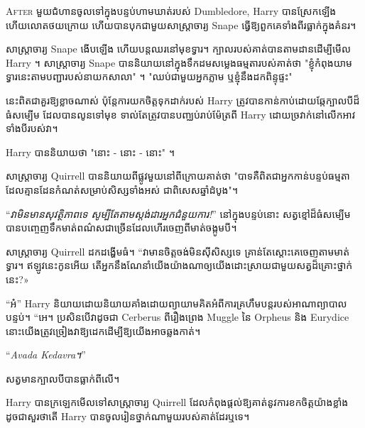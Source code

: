 
\lettrine{A}{fter} មួយជំហានចូលទៅក្នុងបន្ទប់ហាមឃាត់របស់ Dumbledore, Harry បានស្រែកឡើង ហើយលោតថយក្រោយ ហើយបានបុកជាមួយសាស្រ្តាចារ្យ Snape ធ្វើឱ្យពួកគេទាំងពីរធ្លាក់ក្នុងគំនរ។

សាស្រ្តាចារ្យ Snape ងើបឡើង ហើយបន្តឈរនៅមុខទ្វារ។ ក្បាលរបស់គាត់បានតាមដានដើម្បីមើល Harry ។ សាស្ត្រាចារ្យ Snape បាននិយាយនៅក្នុងទឹកដមសម្លេងធម្មតារបស់គាត់ថា "ខ្ញុំកំពុងយាមទ្វារនេះតាមបញ្ជារបស់នាយកសាលា" ។ "ឈប់ជាមួយអ្នកភ្លាម ឬខ្ញុំនឹងដកពិន្ទុផ្ទះ"

នេះពិតជាគួរឱ្យខ្លាចណាស់ ប៉ុន្តែការយកចិត្តទុកដាក់របស់ Harry ត្រូវបានកាន់កាប់ដោយឆ្កែក្បាលបីដ៏ធំសម្បើម ដែលបានលូនទៅមុខ ទាល់តែត្រូវបានបញ្ឈប់រាប់ម៉ែត្រពី Harry ដោយច្រវាក់នៅលើកអាវទាំងបីរបស់វា។

Harry បាននិយាយថា "នោះ - នោះ - នោះ" ។

សាស្ត្រាចារ្យ Quirrell បាន​និយាយ​ពី​ផ្លូវ​មួយ​នៅ​ពី​ក្រោយ​គាត់​ថា "បាទ​គឺ​ពិត​ជា​អ្នក​កាន់​បន្ទប់​ធម្មតា​ដែល​គ្មាន​ដែន​កំណត់​សម្រាប់​សិស្ស​ទាំងអស់ ជាពិសេស​ឆ្នាំ​ដំបូង"។

“\emph{វាមិនមានសុវត្ថិភាពទេ សូម្បីតែតាមស្តង់ដារអ្នកជំនួយការ!}” នៅក្នុងបន្ទប់នោះ សត្វខ្មៅដ៏ធំសម្បើមបានបញ្ចេញទឹកមាត់ពណ៌សជាច្រើនដែលហើរចេញពីមាត់ចង្កូមបី។

សាស្រ្តាចារ្យ Quirrell ដកដង្ហើមធំ។ “វា​មាន​ចិត្ត​ចង់​មិន​ស៊ី​សិស្ស​ទេ គ្រាន់​តែ​ស្តោះ​គេ​ចេញ​តាម​មាត់​ទ្វារ។ ឥឡូវ​នេះ​កូន​អើយ តើ​អ្នក​នឹង​ណែនាំ​យើង​យ៉ាង​ណា​ឲ្យ​យើង​ដោះស្រាយ​ជាមួយ​សត្វ​ដ៏​គ្រោះថ្នាក់​នេះ?»

“អ៎” Harry និយាយ​ដោយ​និយាយ​គាំង​ដោយ​ព្យាយាម​គិត​អំពី​ការ​គ្រហឹម​បន្ត​របស់​អាណាព្យាបាល​បន្ទប់។ “អេ។ ប្រសិនបើវាដូចជា Cerberus ពីរឿងព្រេង Muggle នៃ Orpheus និង Eurydice នោះយើងត្រូវច្រៀងវាឱ្យដេកដើម្បីឱ្យយើងអាចឆ្លងកាត់។

“\emph{Avada Kedavra។}”

សត្វមានក្បាលបីបានធ្លាក់ពីលើ។

Harry បានក្រឡេកមើលទៅសាស្រ្តាចារ្យ Quirrell ដែលកំពុងផ្តល់ឱ្យគាត់នូវការខកចិត្តយ៉ាងខ្លាំង ដូចជាសួរថាតើ Harry បានចូលរៀនថ្នាក់ណាមួយរបស់គាត់ដែរឬទេ។


